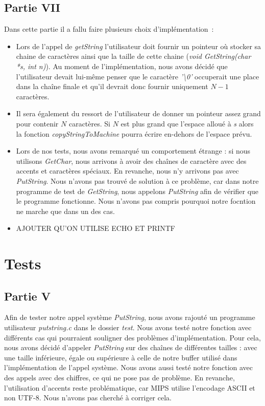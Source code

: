 \documentclass{article}
\begin{document}
\subsection{Partie VII}
Dans cette partie il a fallu faire plusieurs choix d'implémentation :
\begin{itemize}
    \item Lors de l'appel de \textit{getString} l'utilisateur doit fournir un pointeur où
          stocker sa chaine de caractères ainsi que la taille de cette chaine \linebreak
          (\textit{void GetString(char *s, int n)}). Au moment de l'implémentation, nous
          avons décidé que l'utilisateur devait lui-même penser que le caractère
          \textit{'\textbackslash0'} occuperait une place dans la chaîne finale et qu'il
          devrait donc fournir uniquement $N-1$ caractères.
    \item Il sera également du ressort de l'utilisateur de donner un pointeur assez grand
          pour contenir $N$ caractères. Si $N$ est plus grand que l'espace alloué à
          \textit{s} alors la fonction \textit{copyStringToMachine} pourra écrire
          en-dehors de l'espace prévu.
    \item Lors de nos tests, nous avons remarqué un comportement étrange : si nous utilisons
          \textit{GetChar}, nous arrivons à avoir des chaînes de caractère avec des accents 
          et caractères spéciaux. En revanche, nous n'y arrivons pas avec \textit{PutString}.
          Nous n'avons pas trouvé de solution à ce problème, car dans notre programme de test de 
          \textit{GetString}, nous appelons \textit{PutString} afin de vérifier que le programme fonctionne.
          Nous n'avons pas compris pourquoi notre focntion ne marche que dans un des cas.
    \item 
AJOUTER QU'ON UTILISE ECHO ET PRINTF

\end{itemize}

\section{Tests}

\subsection{Partie V}
Afin de tester notre appel système \textit{PutString}, nous avons rajouté un
programme utilisateur \textit{putstring.c }dans le dossier \textit{test}. Nous
avons testé notre fonction avec différents cas qui pourraient souligner des
problèmes d'implémentation. Pour cela, nous avons décidé d'appeler
\textit{PutString} sur des chaînes de différentes tailles : avec une taille
inférieure, égale ou supérieure à celle de notre buffer utilisé dans
l'implémentation de l'appel système. Nous avons aussi testé notre fonction avec
des appels avec des chiffres, ce qui ne pose pas de problème. En revanche,
l'utilisation d'accents reste problématique, car MIPS utilise l'encodage ASCII
et non UTF-8. Nous n'avons pas cherché à corriger cela.
\end{document}
